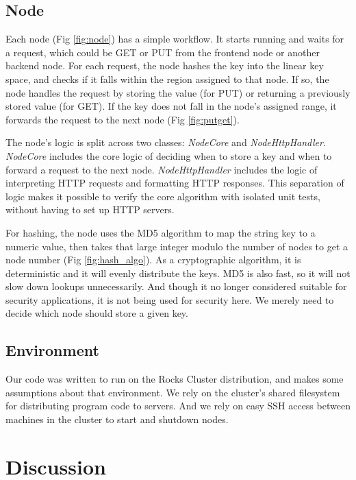 \documentclass[11pt,conference]{IEEEtran}
\begin{document}
\subsection{Node}

Each node (Fig \ref{fig:node}) has a simple workflow. It starts running and
waits for a request, which could be GET or PUT from the frontend node or another
backend node. For each request, the node hashes the key into the linear key
space, and checks if it falls within the region assigned to that node. If so,
the node handles the request by storing the value (for PUT) or returning a
previously stored value (for GET). If the key does not fall in the node's
assigned range, it forwards the request to the next node (Fig \ref{fig:putget}).



The node's logic is split across two classes: \textit{NodeCore} and
\textit{NodeHttpHandler}. \textit{NodeCore} includes the core logic of deciding
when to store a key and when to forward a request to the next node.
\textit{NodeHttpHandler} includes the logic of interpreting HTTP requests and
formatting HTTP responses. This separation of logic makes it possible to verify
the core algorithm with isolated unit tests, without having to set up HTTP
servers.




For hashing, the node uses the MD5 algorithm to map the string key to a numeric
value, then takes that large integer modulo the number of nodes to get a node
number (Fig \ref{fig:hash_algo}). As a cryptographic algorithm, it is
deterministic and it will evenly distribute the keys. MD5 is also
fast\cite{md5rfc}, so it will not slow down lookups unnecessarily. And though it
no longer considered suitable for security applications\cite{md5badrfc}, it is
not being used for security here. We merely need to decide which node should
store a given key.

\subsection{Environment}

Our code was written to run on the Rocks Cluster distribution\cite{rocks}, and
makes some assumptions about that environment. We rely on the cluster's shared
filesystem for distributing program code to servers. And we rely on easy SSH
access between machines in the cluster to start and shutdown nodes.


\section{Discussion}
\end{document}
